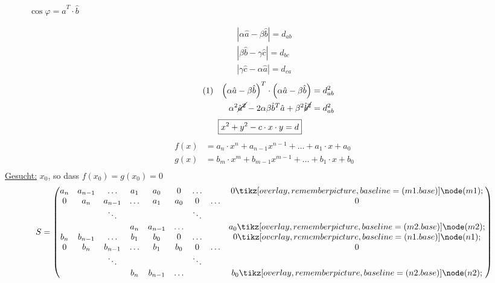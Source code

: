 \begin{figure}[H]
	\centering
	\caption*{$\cos \varphi = \hat{a}^T\cdot\hat{b}$}
\end{figure}
\begin{align*}
\tag{1}&&|\alpha\hat{a}-\beta\hat{b}| = d_{ab}&&\\
\tag{2}&&|\beta\hat{b}-\gamma\hat{c}| = d_{bc}&&\\
\tag{3}&&|\gamma\hat{c}-\alpha\hat{a}| = d_{ca}&&
\end{align*}
\begin{align*}
\tag{1} && \left( \alpha\hat{a}-\beta\hat{b} \right)^T \cdot \left( \alpha\hat{a} - \beta\hat{b} \right) = d^2_{ab}&&\\
&&\alpha^2\cancel{\hat{a}^2} - 2\alpha\beta\hat{b}^T\hat{a} + \beta^2\cancel{\hat{b}^2} = d^2_{ab}&&
\end{align*}
\begin{align*}
\Aboxed{x^2+y^2-c\cdot x\cdot y &= d}
\end{align*}
\begin{align*}
&&f(x) & = a_n\cdot x^n + a_{n-1} x^{n-1} + \ldots + a_1 \cdot x + a_0&&\\
&&g(x) & = b_m\cdot x^m + b_{m-1} x^{m-1} + \ldots + b_1 \cdot x + b_0&&\\
\end{align*}
\underline{Gesucht:} $x_0$, so dass $f(x_0) = g(x_0) = 0$
\[
S=
\begin{pmatrix}
a_n & a_{n-1} & \ldots & a_1& a_0 & 0 & \ldots & & 0\tikzmark{m1}\\
0&a_n & a_{n-1} & \ldots & a_1& a_0 & 0 & \ldots & 0\\
 & & \ddots &  &    &   & \ddots & & \\
&  &  & a_n & a_{n-1}& \ldots &    & & a_0\tikzmark{m2}\\
b_n & b_{n-1} & \ldots & b_1& b_0 & 0 & \ldots & & 0\tikzmark{n1}\\
0&b_n & b_{n-1} & \ldots & b_1& b_0 & 0 & \ldots & 0\\
& & \ddots &  &    &   & \ddots & & \\
&  &  & b_n & b_{n-1}& \ldots &    & & b_0\tikzmark{n2} 
\end{pmatrix}
\]
